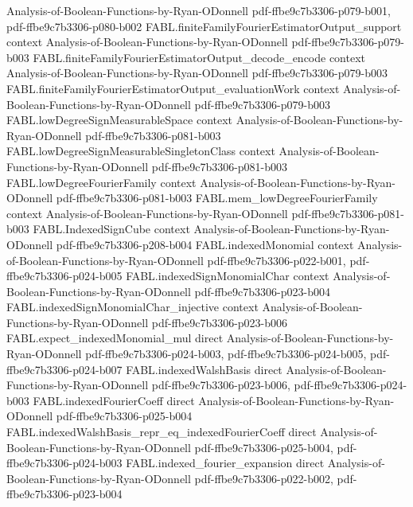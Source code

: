 \begin{theorem}
  {Analysis-of-Boolean-Functions-by-Ryan-ODonnell}
  {pdf-ffbe9c7b3306-p079-b001,
    pdf-ffbe9c7b3306-p080-b002}
\proofstep
  {FABL.finiteFamilyFourierEstimatorOutput_support}
  {context}
  {Analysis-of-Boolean-Functions-by-Ryan-ODonnell}
  {pdf-ffbe9c7b3306-p079-b003}
\proofstep
  {FABL.finiteFamilyFourierEstimatorOutput_decode_encode}
  {context}
  {Analysis-of-Boolean-Functions-by-Ryan-ODonnell}
  {pdf-ffbe9c7b3306-p079-b003}
\proofstep
  {FABL.finiteFamilyFourierEstimatorOutput_evaluationWork}
  {context}
  {Analysis-of-Boolean-Functions-by-Ryan-ODonnell}
  {pdf-ffbe9c7b3306-p079-b003}
\proofstep
  {FABL.lowDegreeSignMeasurableSpace}
  {context}
  {Analysis-of-Boolean-Functions-by-Ryan-ODonnell}
  {pdf-ffbe9c7b3306-p081-b003}
\proofstep
  {FABL.lowDegreeSignMeasurableSingletonClass}
  {context}
  {Analysis-of-Boolean-Functions-by-Ryan-ODonnell}
  {pdf-ffbe9c7b3306-p081-b003}
\proofstep
  {FABL.lowDegreeFourierFamily}
  {context}
  {Analysis-of-Boolean-Functions-by-Ryan-ODonnell}
  {pdf-ffbe9c7b3306-p081-b003}
\proofstep
  {FABL.mem_lowDegreeFourierFamily}
  {context}
  {Analysis-of-Boolean-Functions-by-Ryan-ODonnell}
  {pdf-ffbe9c7b3306-p081-b003}
\proofstep
  {FABL.IndexedSignCube}
  {context}
  {Analysis-of-Boolean-Functions-by-Ryan-ODonnell}
  {pdf-ffbe9c7b3306-p208-b004}
\proofstep
  {FABL.indexedMonomial}
  {context}
  {Analysis-of-Boolean-Functions-by-Ryan-ODonnell}
  {pdf-ffbe9c7b3306-p022-b001,
    pdf-ffbe9c7b3306-p024-b005}
\proofstep
  {FABL.indexedSignMonomialChar}
  {context}
  {Analysis-of-Boolean-Functions-by-Ryan-ODonnell}
  {pdf-ffbe9c7b3306-p023-b004}
\proofstep
  {FABL.indexedSignMonomialChar_injective}
  {context}
  {Analysis-of-Boolean-Functions-by-Ryan-ODonnell}
  {pdf-ffbe9c7b3306-p023-b006}
\proofstep
  {FABL.expect_indexedMonomial_mul}
  {direct}
  {Analysis-of-Boolean-Functions-by-Ryan-ODonnell}
  {pdf-ffbe9c7b3306-p024-b003,
    pdf-ffbe9c7b3306-p024-b005,
    pdf-ffbe9c7b3306-p024-b007}
\proofstep
  {FABL.indexedWalshBasis}
  {direct}
  {Analysis-of-Boolean-Functions-by-Ryan-ODonnell}
  {pdf-ffbe9c7b3306-p023-b006,
    pdf-ffbe9c7b3306-p024-b003}
\proofstep
  {FABL.indexedFourierCoeff}
  {direct}
  {Analysis-of-Boolean-Functions-by-Ryan-ODonnell}
  {pdf-ffbe9c7b3306-p025-b004}
\proofstep
  {FABL.indexedWalshBasis_repr_eq_indexedFourierCoeff}
  {direct}
  {Analysis-of-Boolean-Functions-by-Ryan-ODonnell}
  {pdf-ffbe9c7b3306-p025-b004,
    pdf-ffbe9c7b3306-p024-b003}
\proofstep
  {FABL.indexed_fourier_expansion}
  {direct}
  {Analysis-of-Boolean-Functions-by-Ryan-ODonnell}
  {pdf-ffbe9c7b3306-p022-b002,
    pdf-ffbe9c7b3306-p023-b004}

\end{theorem}
